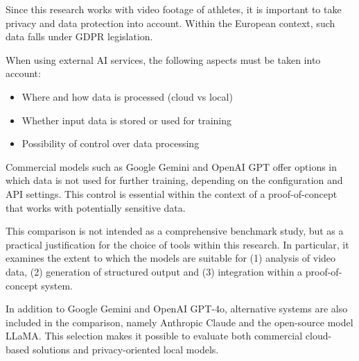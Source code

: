 Since this research works with video footage of athletes, it is important to take privacy and data protection into account. Within the European context, such data falls under GDPR legislation.

When using external AI services, the following aspects must be taken into account:
\begin{itemize}
    \item Where and how data is processed (cloud vs local)
    \item Whether input data is stored or used for training
    \item Possibility of control over data processing
\end{itemize}

Commercial models such as Google Gemini and OpenAI GPT offer options in which data is not used for further training, depending on the configuration and API settings. This control is essential within the context of a proof-of-concept that works with potentially sensitive data.

This comparison is not intended as a comprehensive benchmark study, but as a practical justification for the choice of tools within this research. In particular, it examines the extent to which the models are suitable for (1) analysis of video data, (2) generation of structured output and (3) integration within a proof-of-concept system.

In addition to Google Gemini and OpenAI GPT-4o, alternative systems are also included in the comparison, namely Anthropic Claude and the open-source model LLaMA. This selection makes it possible to evaluate both commercial cloud-based solutions and privacy-oriented local models.

